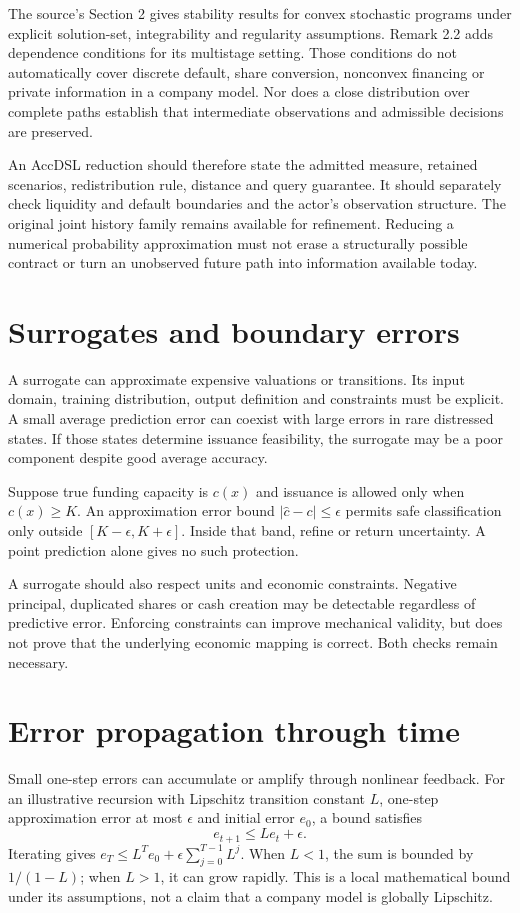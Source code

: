 The source's Section 2 gives stability results for convex stochastic programs under explicit solution-set, integrability and regularity assumptions. Remark 2.2 adds dependence conditions for its multistage setting. Those conditions do not automatically cover discrete default, share conversion, nonconvex financing or private information in a company model. Nor does a close distribution over complete paths establish that intermediate observations and admissible decisions are preserved.

An AccDSL reduction should therefore state the admitted measure, retained scenarios, redistribution rule, distance and query guarantee. It should separately check liquidity and default boundaries and the actor's observation structure. The original joint history family remains available for refinement. Reducing a numerical probability approximation must not erase a structurally possible contract or turn an unobserved future path into information available today.

\section{Surrogates and boundary errors}
A surrogate can approximate expensive valuations or transitions. Its input domain, training distribution, output definition and constraints must be explicit. A small average prediction error can coexist with large errors in rare distressed states. If those states determine issuance feasibility, the surrogate may be a poor component despite good average accuracy.

Suppose true funding capacity is $c(x)$ and issuance is allowed only when $c(x)\geq K$. An approximation error bound $|\hat c-c|\leq\epsilon$ permits safe classification only outside $[K-\epsilon,K+\epsilon]$. Inside that band, refine or return uncertainty. A point prediction alone gives no such protection.

A surrogate should also respect units and economic constraints. Negative principal, duplicated shares or cash creation may be detectable regardless of predictive error. Enforcing constraints can improve mechanical validity, but does not prove that the underlying economic mapping is correct. Both checks remain necessary.



\section{Error propagation through time}
Small one-step errors can accumulate or amplify through nonlinear feedback. For an illustrative recursion with Lipschitz transition constant $L$, one-step approximation error at most $\epsilon$ and initial error $e_0$, a bound satisfies
\begin{equation}
 e_{t+1}\leq Le_t+\epsilon.
\end{equation}
Iterating gives $e_T\leq L^Te_0+\epsilon\sum_{j=0}^{T-1}L^j$. When $L<1$, the sum is bounded by $1/(1-L)$; when $L>1$, it can grow rapidly. This is a local mathematical bound under its assumptions, not a claim that a company model is globally Lipschitz.

